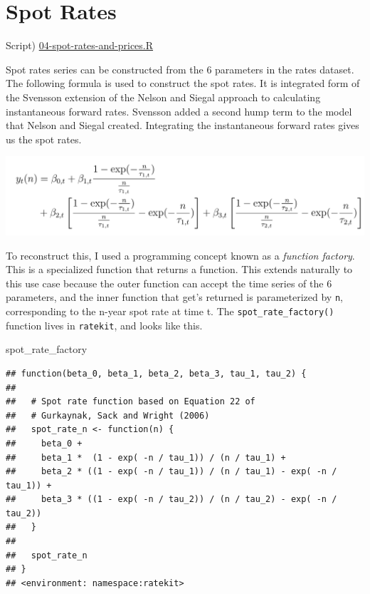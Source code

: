 \documentclass[]{book}
\newenvironment{Shaded}{\begin{snugshade}}{\end{snugshade}}
\newcommand{\NormalTok}[1]{#1}
\theoremstyle{definition}
\theoremstyle{definition}
\theoremstyle{definition}
\theoremstyle{remark}
\begin{document}
\hypertarget{spot-rates}{%
\section{Spot Rates}\label{spot-rates}}

Script)
\href{./R/04-spot-rates-and-prices.R}{04-spot-rates-and-prices.R}

Spot rates series can be constructed from the 6 parameters in the rates
dataset. The following formula is used to construct the spot rates. It
is integrated form of the Svensson extension of the Nelson and Siegal
approach to calculating instantaneous forward rates. Svensson added a
second hump term to the model that Nelson and Siegal created.
Integrating the instantaneous forward rates gives us the spot rates.

\includegraphics[width=26.67in]{images/spot-rates}

To reconstruct this, I used a programming concept known as a
\emph{function factory}. This is a specialized function that returns a
function. This extends naturally to this use case because the outer
function can accept the time series of the 6 parameters, and the inner
function that get's returned is parameterized by \texttt{n},
corresponding to the n-year spot rate at time t. The
\texttt{spot\_rate\_factory()} function lives in \texttt{ratekit}, and
looks like this.

\begin{Shaded}
\begin{Highlighting}[]
\NormalTok{spot_rate_factory}
\end{Highlighting}
\end{Shaded}

\begin{verbatim}
## function(beta_0, beta_1, beta_2, beta_3, tau_1, tau_2) {
## 
##   # Spot rate function based on Equation 22 of
##   # Gurkaynak, Sack and Wright (2006)
##   spot_rate_n <- function(n) {
##     beta_0 +
##     beta_1 *  (1 - exp( -n / tau_1)) / (n / tau_1) +
##     beta_2 * ((1 - exp( -n / tau_1)) / (n / tau_1) - exp( -n / tau_1)) +
##     beta_3 * ((1 - exp( -n / tau_2)) / (n / tau_2) - exp( -n / tau_2))
##   }
## 
##   spot_rate_n
## }
## <environment: namespace:ratekit>
\end{verbatim}
\end{document}
